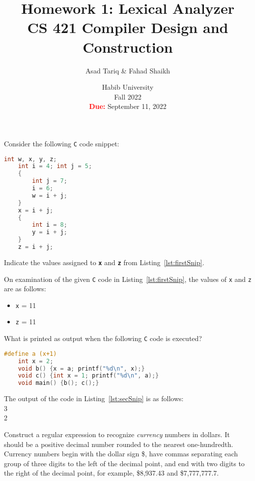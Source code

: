 \documentclass[addpoints]{exam}
\title{Homework 1: Lexical Analyzer\\CS 421 Compiler Design and Construction}
\author{Asad Tariq \& Fahad Shaikh}
\date{Habib University\\Fall 2022\\\textbf{\textcolor{red}{Due:}} September 11, 2022}
\begin{document}
\maketitle

\noindent

\begin{questions}

  \question[1]
  Consider the following \texttt{C} code snippet:
  \begin{lstlisting}[language=C, caption={\texttt{C} code snippet.}, label={lst:firstSnip}]
    int w, x, y, z;
    int i = 4; int j = 5;
    {
        int j = 7;
        i = 6;
        w = i + j;
    }
    x = i + j;
    {
        int i = 8;
        y = i + j;
    }
    z = i + j;
  \end{lstlisting}
  Indicate the values assigned to \textbf{\texttt{x}} and \textbf{\texttt{z}} from Listing~\ref{lst:firstSnip}.

  \begin{solution}
    On examination of the given \texttt{C} code in Listing~\ref{lst:firstSnip}, the values of \texttt{x} and \texttt{z} are as follows:
    \begin{itemize}
      \item \texttt{x} = 11
      \item \texttt{z} = 11
    \end{itemize}
  \end{solution}

  \question[1]
  What is printed as output when the following \texttt{C} code is executed?
  \begin{lstlisting}[language=C, caption={\texttt{C} code snippet.}, label={lst:secSnip}]
    #define a (x+1)
    int x = 2;
    void b() {x = a; printf("%d\n", x);}
    void c() {int x = 1; printf("%d\n", a);}
    void main() {b(); c();}
  \end{lstlisting}

  \begin{solution}
    The output of the code in Listing~\ref{lst:secSnip} is as follows:\\3\\2
  \end{solution}

  \question[1]
  Construct a regular expression to recognize \textit{currency} numbers in dollars.
  It should be a positive decimal number rounded to the nearest one-hundredth.
  Currency numbers begin with the dollar sign \$, have commas separating each group of three digits to the left of the decimal point, and end with two digits to the right of the decimal point, for example, \$8,937.43 and \$7,777,777.7.
  

\end{questions}
\end{document}
